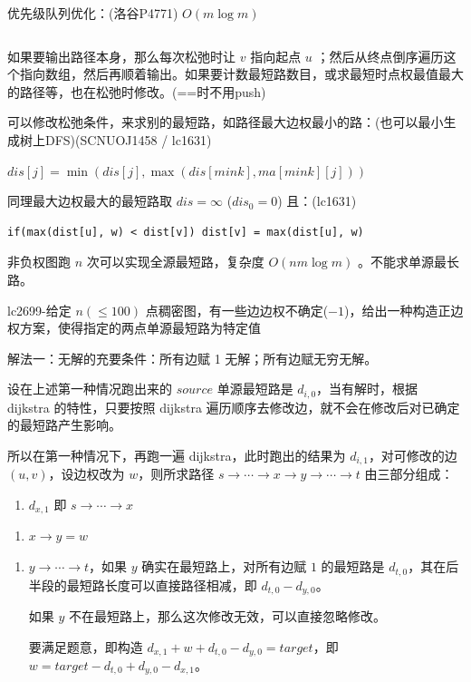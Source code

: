 \documentclass[twocolumn,10pt]{ctexart}
\newcommand{\cds}[1]{\ding{\numexpr191+#1\relax}}
\begin{document}
\inputminted{cpp}{code/ext_038.cpp}

优先级队列优化：(洛谷P4771) $O(m\log m)$

\inputminted{cpp}{code/ext_039.cpp}

如果要输出路径本身，那么每次松弛时让 $v$ 指向起点 $u$ ；然后从终点倒序遍历这个指向数组，然后再顺着输出。如果要计数最短路数目，或求最短时点权最值最大的路径等，也在松弛时修改。(==时不用push)

可以修改松弛条件，来求别的最短路，如路径最大边权最小的路：(也可以最小生成树上DFS)(SCNUOJ1458 / lc1631)

\begin{adjustbox}{max width=\linewidth,center}
$dis[j]=\min(dis[j],\max(dis[mink],ma[mink][j]))$
\end{adjustbox}

同理最大边权最大的最短路取 $dis=\infty$ ($dis_0=0$) 且：(lc1631)

\begin{verbatim}
if(max(dist[u], w) < dist[v]) dist[v] = max(dist[u], w)
\end{verbatim}

非负权图跑 $n$ 次可以实现全源最短路，复杂度 $O(nm\log m)$ 。不能求单源最长路。

\begin{notebox}
lc2699-给定 $n(\le100)$ 点稠密图，有一些边边权不确定($-1$)，给出一种构造正边权方案，使得指定的两点单源最短路为特定值

解法一：无解的充要条件：\cds{1}所有边赋 1 无解；\cds{2}所有边赋无穷无解。

设在上述第一种情况跑出来的 $source$ 单源最短路是 $d_{i,0}$，当有解时，根据 dijkstra 的特性，只要按照 dijkstra 遍历顺序去修改边，就不会在修改后对已确定的最短路产生影响。

所以在第一种情况下，再跑一遍 dijkstra，此时跑出的结果为 $d_{i,1}$，对可修改的边 $(u,v)$，设边权改为 $w$，则所求路径 $s\to \cdots\to x\to y\to\cdots\to t$ 由三部分组成：

\begin{enumerate}
\item $d_{x,1}$ 即 $s\to\cdots\to x$
\end{enumerate}

\begin{enumerate}
\item $x\to y = w$
\end{enumerate}

\begin{enumerate}
\item $y\to\cdots\to t$，如果 $y$ 确实在最短路上，对所有边赋 $1$ 的最短路是 $d_{t,0}$，其在后半段的最短路长度可以直接路径相减，即 $d_{t,0}-d_{y,0}$。

如果 $y$ 不在最短路上，那么这次修改无效，可以直接忽略修改。

要满足题意，即构造 $d_{x,\allowbreak{}1}+w+d_{t,\allowbreak{}0}-d_{y,\allowbreak{}0}=target$，即 $w=target-d_{t,\allowbreak{}0}+d_{y,\allowbreak{}0}-d_{x,\allowbreak{}1}$。
\end{enumerate}
\end{notebox}
\end{document}
